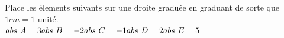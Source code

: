 %
%
    Place les élements suivants sur une droite graduée en graduant de sorte que $1cm = 1$ unité. \\

    $\hfil abs~A = 3 \hfil abs~B=-2 \hfil abs~C=-1 \hfil abs~D=2 \hfil abs~E=5$
